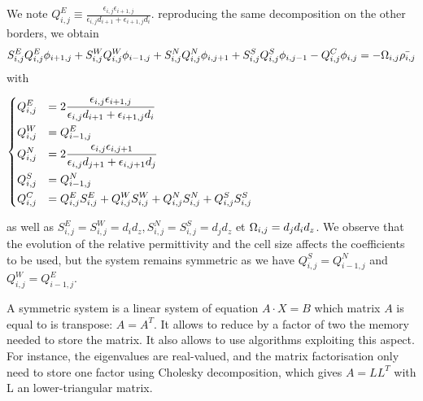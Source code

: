     We note $Q^E_{i,j} \equiv \frac{\epsilon_{i,j} \epsilon_{i+1,j}}{\epsilon_{i,j} d_{i+1} + \epsilon_{i+1,j} d_i}$.
    reproducing the same decomposition on the other borders, we obtain
    \begin{equation}
      \label{eq-descretPoisson1}
    S^E_{i,j} Q^E_{i,j} \phi_{i+1,j} + S^W_{i,j} Q^W_{i,j} \phi_{i-1,j} + S^N_{i,j} Q^N_{i,j} \phi_{i,j+1} + S^S_{i,j} Q^S_{i,j} \phi_{i,j-1} - Q^C_{i,j} \phi_{i,j} = - \Omega_{i,j} \bar{\rho_{i,j}}
    \end{equation}
    with
    \begin{center}
      $\begin{dcases}
     Q^E_{i,j} &= 2\frac{\epsilon_{i,j} \epsilon_{i+1,j}}{\epsilon_{i,j} d_{i+1} + \epsilon_{i+1,j} d_i} \\
     Q^W_{i,j} &= Q^E_{i-1,j} \\
     Q^N_{i,j} &= 2\frac{\epsilon_{i,j} \epsilon_{i,j+1}}{\epsilon_{i,j} d_{j+1} + \epsilon_{i,j+1} d_{j}}\\
     Q^S_{i,j} &= Q^N_{i-1,j} \\
     Q^C_{i,j} &= Q^E_{i,j}S^E_{i,j}+Q^W_{i,j}S^W_{i,j}+Q^N_{i,j}S^N_{i,j}+Q^S_{i,j}S^S_{i,j}
     \end{dcases}$
    \end{center}

    as well as $S^E_{i,j} = S^W_{i,j} =d_id_z, S^N_{i,j} = S^S_{i,j}= d_jd_z$ et $\Omega_{i,j} = d_jd_id_z$.
    We observe that the evolution of the relative permittivity and the cell size affects the coefficients to be used, but the system remains symmetric as we have $Q^S_{i,j} = Q^N_{i-1,j}$ and $ Q^W_{i,j} = Q^E_{i-1,j}$.
    
    A symmetric system is a linear system of equation $A \cdot X = B$  which matrix $A$ is equal to is transpose: $A = A^T$.
    It allows to reduce by a factor of two the memory needed to store the matrix.
    It also allows to use algorithms exploiting this aspect.
    For instance, the eigenvalues are real-valued, and the matrix factorisation only need to store one factor using Cholesky decomposition, which gives $A = L L^T$ with L an lower-triangular matrix. 

